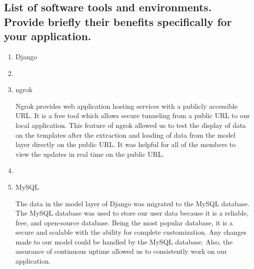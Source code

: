 \documentclass[letterpaper, 12 pt, conference]{ieeeconf}
\begin{document}
\subsection{List of software tools and environments. Provide briefly their benefits specifically for your application.}
\begin{enumerate}
   \item Django
   \item[]
   \item ngrok
    \begin{description}
        Ngrok provides web application hosting services with a publicly accessible URL. It is a free tool which allows secure tunneling from a public URL to our local application. This feature of ngrok allowed us to test the display of data on the templates after the extraction and loading of data from the model layer directly on the public URL. It was helpful for all of the members to view the updates in real time on the public URL.
    \end{description}
    \item[]
   \item MySQL
   \begin{description}
       The data in the model layer of Django was migrated to the MySQL database. The MySQL database was used to store our user data because it is a reliable, free, and open-source database. Being the most popular database, it is a secure and scalable with the ability for complete customization. Any changes made to our model could be handled by the MySQL database. Also, the assurance of continuous uptime allowed us to consistently work on our application.
   \end{description}
\end{enumerate}
\newpage
\end{document}
